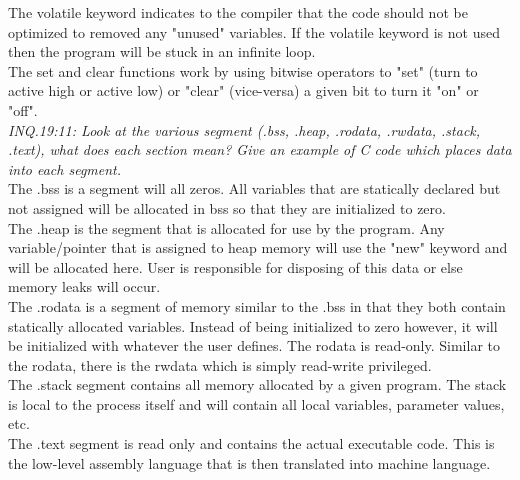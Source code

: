 \documentclass[journal, twocolumn, final,11pt,letterpaper]{IEEEtran}
\begin{document}
The volatile keyword indicates to the compiler that the code should not be optimized to removed any "unused" variables. If the volatile keyword is not used then the program will be stuck in an infinite loop.\\

The set and clear functions work by using bitwise operators to "set" (turn to active high or active low) or "clear" (vice-versa) a given bit to turn it "on" or "off".\\

\textit{INQ.19:11: Look at the various segment (.bss, .heap, .rodata, .rwdata, .stack, .text), what does each section mean? Give an example of C code which places data into each segment.} \\

The .bss is a segment will all zeros. All variables that are statically declared but not assigned will be allocated in bss so that they are initialized to zero.\\

The .heap is the segment that is allocated for use by the program. Any variable/pointer that is assigned to heap memory will use the "new" keyword and will be allocated here. User is responsible for disposing of this data or else memory leaks will occur.\\

The .rodata is a segment of memory similar to the .bss in that they both contain statically allocated variables. Instead of being initialized to zero however, it will be initialized with whatever the user defines. The rodata is read-only. Similar to the rodata, there is the rwdata which is simply read-write privileged. \\

The .stack segment contains all memory allocated by a given program. The stack is local to the process itself and will contain all local variables, parameter values, etc.\\

The .text segment is read only and contains the actual executable code. This is the low-level assembly language that is then translated into machine language.\\

\end{document}
